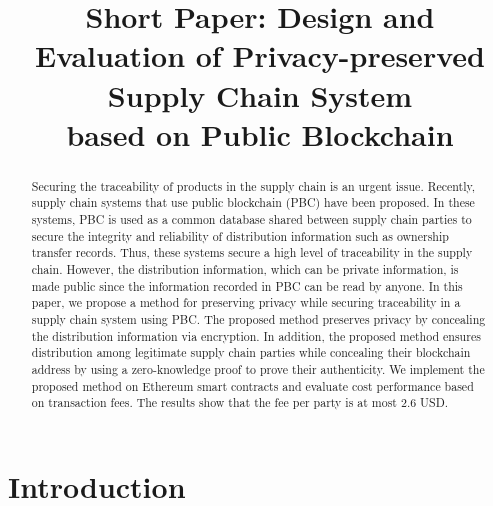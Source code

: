 \documentclass[conference]{IEEEtran}
\begin{document}
\title{Short Paper: Design and Evaluation of Privacy-preserved 
Supply Chain System\\ based on Public Blockchain}




\author{
     }



\maketitle


\begin{abstract} Securing the traceability of products in the supply chain is an urgent issue.
Recently, supply chain systems that use public blockchain (PBC) have been proposed.
In these systems, PBC is used as a common database shared between supply chain parties to secure the integrity and reliability of distribution information such as ownership transfer records.
Thus, these systems secure a high level of traceability in the supply chain.
However, the distribution information, which can be private information, is made public since the information recorded in PBC can be read by anyone.
In this paper, we propose a method for preserving privacy while securing traceability in a supply chain system using PBC.
The proposed method preserves privacy by concealing the distribution information via encryption.
In addition, the proposed method ensures distribution among legitimate supply chain parties while concealing their blockchain address by using a zero-knowledge proof to prove their authenticity. We implement the proposed method on Ethereum smart contracts and evaluate cost performance based on transaction fees.
The results show that the fee per party is at most 2.6 USD.
\end{abstract}

\IEEEpeerreviewmaketitle

\section{Introduction}
\end{document}

